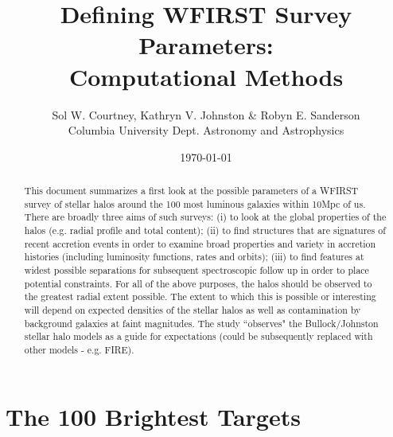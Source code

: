 \documentclass[11pt,a4paper,fleqn,notitlepage,oneside]{article}
\title{Defining WFIRST Survey Parameters: \\ Computational Methods}
\author{Sol W. Courtney, Kathryn V. Johnston \& Robyn E. Sanderson \\ Columbia University Dept. Astronomy and Astrophysics}
\date{\today}
\begin{document}
\maketitle

\begin{abstract}
	This document summarizes a first look at the possible parameters of a WFIRST survey of stellar halos around the 100 most luminous galaxies within 10Mpc of us. 
	There are broadly three aims of such surveys: (i) to look at the global properties of the halos (e.g. radial profile and total content); (ii) to find structures that are signatures of recent accretion events in order to examine broad properties and variety in accretion histories (including luminosity functions, rates and orbits); (iii) to find features at widest possible separations for subsequent spectroscopic follow up in order to place potential constraints.
	For all of the above purposes, the halos should be observed to the greatest radial extent possible.
	The extent to which this is possible or interesting will depend on expected densities of the stellar halos as well as contamination by background galaxies at faint magnitudes.
	The study “observes" the Bullock/Johnston stellar halo models as a guide for expectations (could be subsequently replaced with other models - e.g. FIRE).
\end{abstract}

\section{The 100 Brightest Targets} %
	\label{sec:the_100_brightest_targets}
\end{document}
